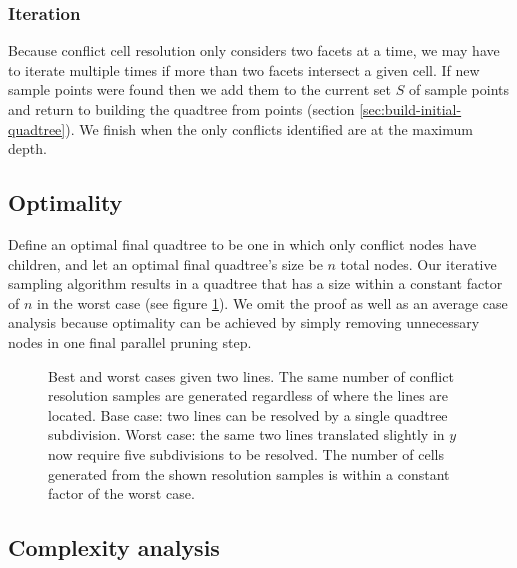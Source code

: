 \documentclass[final,3p,times,twocolumn]{elsarticle}
\begin{document}
\subsubsection{Iteration}
\label{sec:iterate}

Because conflict cell resolution only considers two facets at a time, we may have to iterate multiple times if more than two facets intersect a given cell. If new sample points were found then we add them to the current set $S$ of sample points and return to building the quadtree from points (section \ref{sec:build-initial-quadtree}). We finish when the only conflicts identified are at the maximum depth.

\subsection{Optimality}
Define an optimal final quadtree to be one in which only conflict nodes have children, and let an optimal final quadtree's size be $n$ total nodes. Our iterative sampling algorithm results in a quadtree that has a size within a constant factor of $n$ in the worst case (see figure \ref{fig:optimality}). We omit the proof as well as an average case analysis because optimality can be achieved by simply removing unnecessary nodes in one final parallel pruning step.

\begin{figure}
  \centering
  \caption{
    Best and worst cases given two lines. The same number of conflict resolution samples are generated regardless of where the lines are located.
    \protect{} Base case: two lines can be resolved by a single quadtree subdivision.
    \protect{} Worst case: the same two lines translated slightly in $y$ now require five subdivisions to be resolved.
    \protect{} The number of cells generated from the shown resolution samples is within a constant factor of the worst case.
  }
  \label{fig:optimality}
\end{figure}

\subsection{Complexity analysis}
\end{document}
